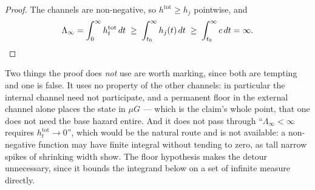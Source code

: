 \begin{proof}
The channels are non-negative, so $h^{\mathrm{tot}}\ge h_j$ pointwise,
and
\[
\Lambda_\infty=\int_0^{\infty}h^{\mathrm{tot}}_t\,dt
\;\ge\;\int_{t_0}^{\infty}h_j(t)\,dt
\;\ge\;\int_{t_0}^{\infty}c\,dt=\infty. \qedhere
\]
\end{proof}

\noindent Two things the proof does \emph{not} use are worth marking,
since both are tempting and one is false. It uses no property of the
other channels: in particular the internal channel need not
participate, and a permanent floor in the external channel alone
places the state in $\mu G$ --- which is the claim's whole point, that
one does not need the base hazard entire. And it does not pass through
``$\Lambda_\infty<\infty$ requires $h^{\mathrm{tot}}_t\to0$'', which
would be the natural route and is not available: a non-negative
function may have finite integral without tending to zero, as tall
narrow spikes of shrinking width show. The floor hypothesis makes the
detour unnecessary, since it bounds the integrand below on a set of
infinite measure directly.


